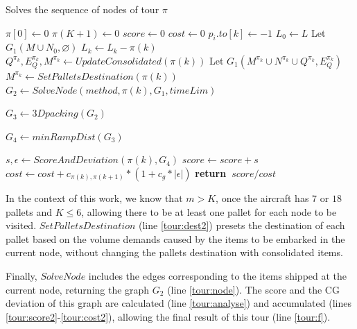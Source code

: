 \documentclass[preprint,authoryear]{elsarticle}
\renewcommand{\Return}{\State \bf {return}~}
\begin{document}
\begin{algorithm}[H]
	\caption{ Solves the sequence of nodes of tour $\pi$ }  \label{alg:tour}
	
	\begin{algorithmic}[1]
		
		
		\State $\pi[0] \gets 0$ \label{tour:pi1}
		\State $\pi(K+1) \gets 0$ \label{tour:pi2}
		\State $score \gets 0$ \label{tour:score}
		\State $cost \gets 0$ \label{tour:cost}
		 \label{tour:loop1}		
				\State $p_i.to[k] \gets -1$ \label{tour:-1} 
			\EndFor	
				\State $L_0 \gets L$
				\State Let $G_1(M \cup N_0, \varnothing)$ \label{tour:g11}
			\Else
				\State $L_k \gets L_k - \pi(k)$  \label{tour:lk1}			
				\State $Q^{\pi_k}, E_Q^{\pi_k}, M^{\pi_k} \gets UpdateConsolidated(\pi(k))$ \label{tour:dest}			
				\State Let $G_1(M^{\pi_k} \cup N^{\pi_k} \cup Q^{\pi_k}, E_Q^{\pi_k})$ \label{tour:g12}
			\EndIf  \label{tour:lk2}	
			\State $M^{\pi_k} \gets SetPalletsDestination( \pi(k) )$ \label{tour:dest2}		
			\State $G_2 \gets SolveNode(method, \pi(k), G_1, timeLim)$ \label{tour:node}

{\color{purple} \State	$G_3 \gets 3Dpacking(G_2)$  \label{tour:3dpacking} }	
		
{\color{blue}   \State	$G_4 \gets minRampDist(G_3)$  \label{tour:minRampDist} }
			
			\State $s, \epsilon \gets ScoreAndDeviation(\pi(k), G_4)$ \label{tour:analyse}
			\State $score \gets score + s$ \label{tour:score2}
			\State $cost \gets cost + c_{\pi(k),\pi(k+1)} * (1 + c_g * |\epsilon|)$ \label{tour:cost2} 
		\EndFor  \label{tour:loop2}
		\Return $score / cost$ \label{tour:f}
		
		\EndProcedure
		
	\end{algorithmic}
\end{algorithm}


In the context of this work, we know that $m>K$, once the aircraft has $7$\/ or $18$\/ pallets and $K\leq 6$, allowing there to be at least one pallet for each node to be visited. $SetPalletsDestination$\/ (line \ref{tour:dest2}) presets the destination of each pallet based on the volume demands caused by the items to be embarked in the current node, without changing the pallets destination with consolidated items.

Finally, $SolveNode$\/ includes the edges corresponding to the items shipped at the current node, returning the graph $G_2$\/ (line \ref{tour:node}). The score and the CG deviation of this graph are calculated (line \ref{tour:analyse}) and accumulated (lines \ref{tour:score2}-\ref{tour:cost2}), allowing the final result of this tour (line \ref{tour:f}).
\end{document}
